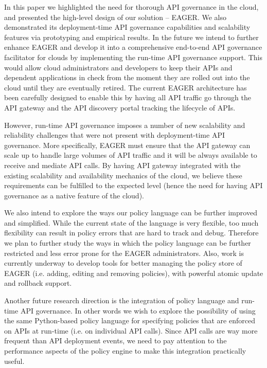 In this paper we highlighted the need for thorough API governance in the cloud, and 
presented the high-level design of our solution -- EAGER. We also demonstrated its
deployment-time API governance capabilities and scalability features via prototyping and 
empirical results. In the future we intend to further enhance EAGER and develop it into
a comprehensive end-to-end API governance facilitator for clouds by implementing the
run-time API governance support. This would allow cloud administrators and developers
to keep their APIs and dependent applications in check from  the moment they are rolled out into
the cloud until they are eventually retired. The current EAGER architecture has been carefully
designed to enable this by having all API traffic go through the API gateway and the API discovery
portal tracking the lifecycle of APIs.

However, run-time API governance imposes a number of new scalability and reliability challenges
that were not present with deployment-time API governance. More specifically, EAGER must ensure
that the API gateway can scale up to handle large volumes of API traffic and it will be always available
to receive and mediate API calls. By having API gateway integrated with the existing scalability and
availability mechanics of the cloud, we believe these requirements can be fulfilled to the expected
level (hence the need for having API governance as a native feature of the cloud).

We also intend to explore the ways our policy language can be further improved and simplified.
While the current state of the language is very flexible, too much flexibility can result in policy errors
that are hard to track and debug. Therefore we plan to further study the ways in which the policy language
can be further restricted and less error prone for the EAGER administrators. Also, work is currently underway
to develop tools for better managing the policy store of EAGER (i.e. adding, editing and removing policies),
with powerful atomic update and rollback support.

Another future research direction is the integration of policy language and run-time API governance. In
other words we wish to explore the possibility of using the same Python-based policy language for
specifying policies that are enforced on APIs at run-time (i.e. on individual API calls). Since API calls
are way more frequent than API deployment events, we need to pay attention to the performance aspects
of the policy engine to make this integration practically useful.

